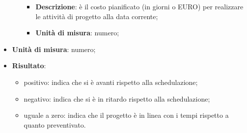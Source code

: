 \begin{itemize}
\begin{itemize}
	 				\begin{itemize}
	 					\item \textbf{Descrizione}: è il costo pianificato (in giorni o EURO) per realizzare le attività di progetto alla data corrente;
	 					\item \textbf{Unità di misura}: numero;
	 				\end{itemize}
	 			\end{itemize}
	 		\item \textbf{Unità di misura}: numero;
	 		\item \textbf{Risultato}:
	 			\begin{itemize}
	 				\item positivo: indica che si è avanti rispetto alla schedulazione;
	 				\item negativo: indica che si è in ritardo rispetto alla schedulazione;
	 				\item uguale a zero: indica che il progetto è in linea con i tempi rispetto a quanto preventivato. \\
	 			\end{itemize}
	 	\end{itemize}

